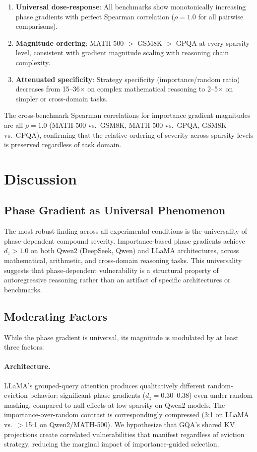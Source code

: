 \documentclass[11pt,a4paper]{article}
\begin{document}
\begin{enumerate}
\item \textbf{Universal dose-response}: All benchmarks show monotonically increasing phase gradients with perfect Spearman correlation ($\rho = 1.0$ for all pairwise comparisons).
\item \textbf{Magnitude ordering}: MATH-500 $>$ GSM8K $>$ GPQA at every sparsity level, consistent with gradient magnitude scaling with reasoning chain complexity.
\item \textbf{Attenuated specificity}: Strategy specificity (importance/random ratio) decreases from 15--36$\times$ on complex mathematical reasoning to 2--5$\times$ on simpler or cross-domain tasks.
\end{enumerate}

The cross-benchmark Spearman correlations for importance gradient magnitudes are all $\rho = 1.0$ (MATH-500 vs.\ GSM8K, MATH-500 vs.\ GPQA, GSM8K vs.\ GPQA), confirming that the relative ordering of severity across sparsity levels is preserved regardless of task domain.

\section{Discussion}

\subsection{Phase Gradient as Universal Phenomenon}

The most robust finding across all experimental conditions is the universality of phase-dependent compound severity. Importance-based phase gradients achieve $d_z > 1.0$ on both Qwen2 (DeepSeek, Qwen) and LLaMA architectures, across mathematical, arithmetic, and cross-domain reasoning tasks. This universality suggests that phase-dependent vulnerability is a structural property of autoregressive reasoning rather than an artifact of specific architectures or benchmarks.

\subsection{Moderating Factors}

While the phase gradient is universal, its magnitude is modulated by at least three factors:

\paragraph{Architecture.} LLaMA's grouped-query attention produces qualitatively different random-eviction behavior: significant phase gradients ($d_z = 0.30$--$0.38$) even under random masking, compared to null effects at low sparsity on Qwen2 models. The importance-over-random contrast is correspondingly compressed (3:1 on LLaMA vs.\ $>$15:1 on Qwen2/MATH-500). We hypothesize that GQA's shared KV projections create correlated vulnerabilities that manifest regardless of eviction strategy, reducing the marginal impact of importance-guided selection.
\end{document}
